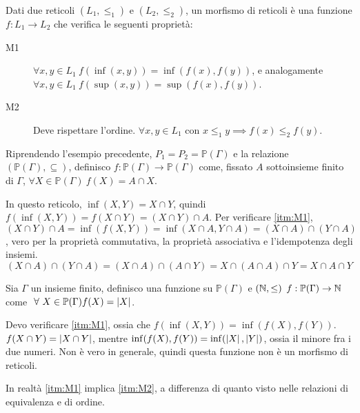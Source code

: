 \begin{defn}
Dati due reticoli $(L_1, \le_1)$ e $(L_2, \le_2)$, un morfismo di reticoli \`e una funzione $f : L_1 \to L_2$ che verifica le seguenti propriet\`a:
\begin{description}
  \item[M1\label{itm:M1}] $\forall x, y \in L_1 \ f(\inf(x,y)) = \inf(f(x),f(y))$, e analogamente $\forall x, y \in L_1 \ f(\sup(x,y)) = \sup(f(x),f(y))$.
  \item[M2\label{itm:M2}] Deve rispettare l'ordine. $\forall x, y \in L_1 $ con $x \le_1 y \implies f(x) \le_2 f(y)$.
\end{description}
\end{defn}

\begin{exmp}
Riprendendo l'esempio precedente, $P_1 = P_2 = \mathbb{P}(\Gamma)$ e la relazione $(\mathbb{P}(\Gamma), \subseteq)$, definisco $f : \mathbb{P}(\Gamma) \to \mathbb{P}(\Gamma)$ come, fissato $A$ sottoinsieme finito di $\Gamma$, $\forall X \in \mathbb{P}(\Gamma) \ f(X) = A \cap X$.

In questo reticolo, $\inf(X,Y) = X \cap Y$, quindi $f(\inf(X,Y)) = f(X \cap Y) = (X \cap Y) \cap A$. Per verificare \ref{itm:M1}, $(X \cap Y) \cap A = \inf(f(X,Y)) = \inf(X \cap A, Y \cap A) = (X \cap A) \cap (Y \cap A)$, vero per la propriet\`a commutativa, la propriet\`a associativa e l'idempotenza degli insiemi.
\[
(X \cap A) \cap (Y \cap A) = (X \cap A) \cap (A \cap Y) = X \cap (A \cap A) \cap Y = X \cap A \cap Y
\]
\end{exmp}

\begin{exmp}\label{morfismo_no_reticoli}
Sia $\Gamma$ un insieme finito, definisco una funzione su $\mathbb{P}(\Gamma)$ e $(\mathbb{N}, \le)$ $f : \mathbb{P}(\Gamma) \to \mathbb{N}$ come $\forall X \in \mathbb{P}(\Gamma) f(X) = \abs{X}$.

Devo verificare \ref{itm:M1}, ossia che $f(\inf(X,Y)) = \inf(f(X),f(Y))$. $f(X \cap Y) = \left\lvert{X \cap Y}\right\rvert$, mentre $\inf(f(X),f(Y)) = \inf(\left\lvert{X}\right\rvert,\left\lvert{Y}\right\rvert)$, ossia il minore fra i due numeri. Non \`e vero in generale, quindi questa funzione non \`e un morfismo di reticoli.
\end{exmp}

In realt\`a \ref{itm:M1} implica \ref{itm:M2}, a differenza di quanto visto nelle relazioni di equivalenza e di ordine.

